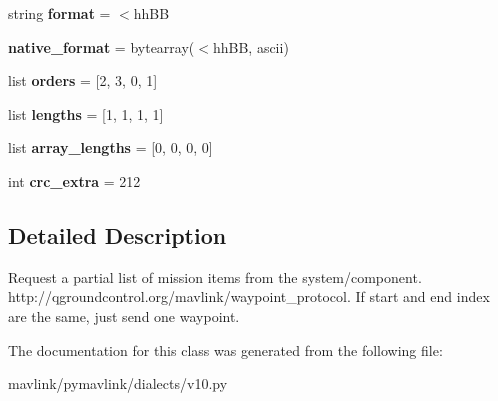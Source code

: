 \begin{DoxyCompactItemize}
string {\bfseries format} = \textquotesingle{}$<$hh\+BB\textquotesingle{}
\item 
\mbox{\label{classpymavlink_1_1dialects_1_1v10_1_1MAVLink__mission__request__partial__list__message_af2f6c4aeebe4726cf6995ca46e8e0463}} 
{\bfseries native\+\_\+format} = bytearray(\textquotesingle{}$<$hh\+BB\textquotesingle{}, \textquotesingle{}ascii\textquotesingle{})
\item 
\mbox{\label{classpymavlink_1_1dialects_1_1v10_1_1MAVLink__mission__request__partial__list__message_a52b31add69a518a39c46cf243df8e53e}} 
list {\bfseries orders} = \mbox{[}2, 3, 0, 1\mbox{]}
\item 
\mbox{\label{classpymavlink_1_1dialects_1_1v10_1_1MAVLink__mission__request__partial__list__message_a6b9f61aa8fb7f0125ef93d783ef9f234}} 
list {\bfseries lengths} = \mbox{[}1, 1, 1, 1\mbox{]}
\item 
\mbox{\label{classpymavlink_1_1dialects_1_1v10_1_1MAVLink__mission__request__partial__list__message_aef7051bbb93733ae7d0ff44ff21d2250}} 
list {\bfseries array\+\_\+lengths} = \mbox{[}0, 0, 0, 0\mbox{]}
\item 
\mbox{\label{classpymavlink_1_1dialects_1_1v10_1_1MAVLink__mission__request__partial__list__message_a359cf8d45e2c334e473bd33b57cb24f4}} 
int {\bfseries crc\+\_\+extra} = 212
\end{DoxyCompactItemize}


\subsection{Detailed Description}
\begin{DoxyVerb}Request a partial list of mission items from the
system/component.
http://qgroundcontrol.org/mavlink/waypoint_protocol. If start
and end index are the same, just send one waypoint.
\end{DoxyVerb}
 

The documentation for this class was generated from the following file\+:\begin{DoxyCompactItemize}
\item 
mavlink/pymavlink/dialects/v10.\+py\end{DoxyCompactItemize}
